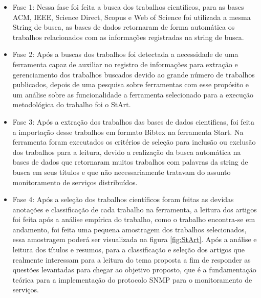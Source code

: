 \begin{itemize}
\item Fase 1: Nessa fase foi feita a busca dos trabalhos científicos, para as bases ACM, IEEE, Science Direct, Scopus e Web of Science foi utilizada a mesma String de busca, as bases de dados retornaram de forma automática os trabalhos relacionados com as informações registradas na string de busca.     
\item Fase 2: Após a buscas dos trabalhos foi detectada a necessidade de uma ferramenta capaz de auxiliar no registro de informações para extração e gerenciamento dos trabalhos buscados devido ao grande número de trabalhos publicados, depois de uma pesquisa sobre ferramentas com esse propósito e um análise sobre as funcionalidade a ferramenta selecionado para a execução metodológica do trabalho foi o StArt\cite{de2002pesquisas,zamboni2010start}.  
\item Fase 3: Após a extração dos trabalhos das bases de dados cientificas, foi feita a importação desse trabalhos em formato Bibtex na ferramenta Start. Na ferramenta foram executados os critérios de seleção para inclusão ou exclusão dos trabalhos para a leitura, devido a realização da busca automática na bases de dados que retornaram muitos trabalhos com palavras da string de busca em seus títulos e que não necessariamente tratavam do assunto monitoramento de serviços distribuídos.

\item Fase 4: Após a seleção dos trabalhos científicos foram feitas as devidas anotações e classificação de cada trabalho na ferramenta, a leitura dos artigos foi feita após a análise empírica do trabalho, como o trabalho encontra-se em andamento, foi feita uma pequena amostragem dos trabalhos selecionados, essa amostragem poderá ser visualizada na figura \ref{fig:StArt}. Após a análise e leitura dos títulos e resumos, para a classificação e seleção dos artigos que realmente interessam para a leitura do tema proposta a fim de responder as questões levantadas para chegar ao objetivo proposto, que é a fundamentação teórica para a implementação do protocolo SNMP para o monitoramento de serviços. 
\end{itemize}

